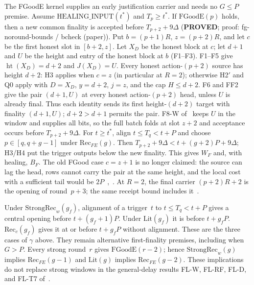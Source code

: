 \documentclass{article}
\theoremstyle{plain}
\theoremstyle{definition}
\theoremstyle{remark}
\newcommand{\PROVED}{\textbf{PROVED}}
\begin{document}
The FGoodE kernel supplies an early justification carrier and needs no
$G\leq P$ premise.  Assume $\mathrm{HEALING\_INPUT}(t^*)$ and $T_p\geq t^*$.
If $\mathrm{FGoodE}(p)$ holds, then a new common finality is accepted
before $T_{p+2}+9\Delta$ (\PROVED; proof: fg-noround-bounds / bcheck (paper)).
Put $b=(p+1)R$, $z=(p+2)R$, and let $c$ be the first honest slot in
$[b+2,z]$.  Let $X_D$ be the honest block at $c$; let $d+1$ and $U$
be the height and entry of the honest block at $b$ (F1--F3).
F1--F5 give $\operatorname{ht}(X_D)=d+2$ and $J(X_D)=U$.
Every honest action-$(p+2)$ source has height $d+2$: H3 applies when
$c=z$ (in particular at $R=2$); otherwise H2$'$ and Q0 apply with
$D=X_D$, $y=d+2$, $j=z$, and the cap $H\leq d+2$.
F6 and FF2 give the pair $(d+1,U)$ at every honest action-$(p+2)$
head, unless $U$ is already final.
Thus each identity sends its first height-$(d+2)$ target with finality
$(d+1,U)$; $d+2>d+1$ permits the pair.  F8-W of~\cite[\S4a]{BPF}
keeps $U$ in the window and supplies all bits, so the full batch folds
at slot $z+2$ and acceptance occurs before $T_{p+2}+9\Delta$.
For $t\geq t^*$, align $t\leq T_q<t+P$ and choose
$p\in[q,q+g-1]$ under $\mathrm{Rec}_{FE}(g)$.
Then $T_{p+2}+9\Delta<t+(g+2)P+9\Delta$; H3/H4 put the trigger
outputs below the new finality.  This gives $W_F$ and, with healing, $B_F$.
The old FGood case $c=z+1$ is no longer claimed: the source can lag the
head, rows cannot carry the pair at the same height, and the local cost
with a sufficient tail would be $2P$~\cite[\S A]{NRBC},~\cite[\S2]{NRB}.
At $R=2$, the final carrier $(p+2)R+2$ is the opening of round~$p+3$;
the same receipt bound includes it~\cite[\S4a, FF5-S]{BPF}.

Under $\mathrm{StrongRec}_{w}(g_f)$, alignment of a trigger~$t$ to
$t\leq T_q<t+P$ gives a central opening before $t+(g_f+1)P$.
Under $\mathrm{Lit}(g_f)$ it is before $t+g_fP$.
$\mathrm{Rec}_{c}(g_f)$ gives it at or before $t+g_fP$ without
alignment.  These are the three cases of $\gamma$ above.  They remain
alternative first-finality premises, including when $G>P$.
Every strong round~$r$ gives $\mathrm{FGoodE}(r-2)$; hence
$\mathrm{StrongRec}_{w}(g)$ implies $\mathrm{Rec}_{FE}(g-1)$ and
$\mathrm{Lit}(g)$ implies $\mathrm{Rec}_{FE}(g-2)$.
These implications do not replace strong windows in the general-delay
results FL-W, FL-RF, FL-D, and FL-T7 of~\cite{BPF}.
\end{document}
